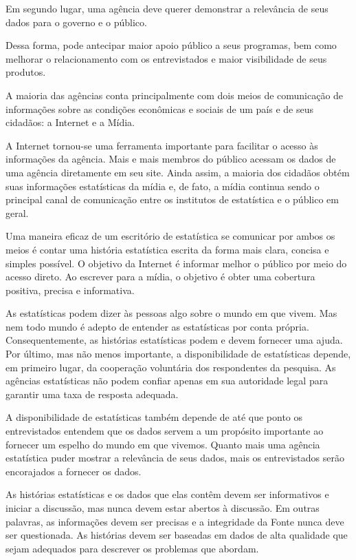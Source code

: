 Em segundo lugar, uma agência deve querer demonstrar a relevância de seus dados para o governo e o público.\vskip0.3cm 

Dessa forma, pode antecipar maior apoio público a seus programas, bem como melhorar o relacionamento com os entrevistados e maior visibilidade de seus produtos.\vskip0.3cm 

A maioria das agências conta principalmente com dois meios de comunicação de informações sobre as condições econômicas e sociais de um país e de seus cidadãos: a Internet e a Mídia.\vskip0.3cm 

A Internet tornou-se uma ferramenta importante para facilitar o acesso às informações da agência. Mais e mais membros do público acessam os dados de uma agência diretamente em seu site. Ainda assim, a maioria dos cidadãos obtém suas informações estatísticas da mídia e, de fato, a mídia continua sendo o principal canal de comunicação entre os institutos de estatística e o público em geral.\vskip0.3cm 


Uma maneira eficaz de um escritório de estatística se comunicar por ambos os meios é contar uma história estatística escrita da forma mais clara, concisa e simples possível. O objetivo da Internet é informar melhor o público por meio do acesso direto. Ao escrever para a mídia, o objetivo é obter uma cobertura positiva, precisa e informativa.\vskip0.3cm 

As estatísticas podem dizer às pessoas algo sobre o mundo em que vivem. Mas nem todo mundo é adepto de entender as estatísticas por conta própria. Consequentemente, as histórias estatísticas podem e devem fornecer uma ajuda.
Por último, mas não menos importante, a disponibilidade de estatísticas depende, em primeiro lugar, da cooperação voluntária dos respondentes da pesquisa. As agências estatísticas não podem confiar apenas em sua autoridade legal para garantir uma taxa de resposta adequada.\vskip0.3cm 


A disponibilidade de estatísticas também depende de até que ponto os entrevistados entendem que os dados servem a um propósito importante ao fornecer um espelho do mundo em que vivemos. Quanto mais uma agência estatística puder mostrar a relevância de seus dados, mais os entrevistados serão encorajados a fornecer os dados.\vskip0.3cm 

 As histórias estatísticas e os dados que elas contêm devem ser informativos e iniciar a discussão, mas nunca devem estar abertos à discussão. Em outras palavras, as informações devem ser precisas e a integridade da Fonte nunca deve ser questionada. As histórias devem ser baseadas em dados de alta qualidade que sejam adequados para descrever os problemas que abordam.\vskip0.3cm 



